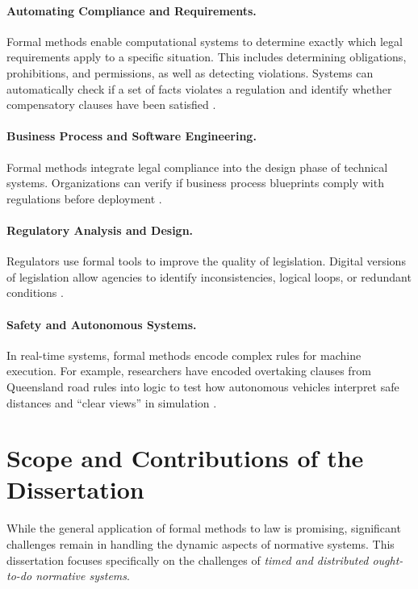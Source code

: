 \paragraph{Automating Compliance and Requirements.}

Formal methods enable computational systems to determine exactly which legal requirements apply to a specific situation. This includes determining obligations, prohibitions, and permissions, as well as detecting violations. Systems can automatically check if a set of facts violates a regulation and identify whether compensatory clauses have been satisfied \cite{governatori2018compliance}.

\paragraph{Business Process and Software Engineering.}

Formal methods integrate legal compliance into the design phase of technical systems. Organizations can verify if business process blueprints comply with regulations before deployment \cite{vanDerAalst2011compliance}.

\paragraph{Regulatory Analysis and Design.}

Regulators use formal tools to improve the quality of legislation. Digital versions of legislation allow agencies to identify inconsistencies, logical loops, or redundant conditions \cite{sergot1986british}.

\paragraph{Safety and Autonomous Systems.}

In real-time systems, formal methods encode complex rules for machine execution. For example, researchers have encoded overtaking clauses from Queensland road rules into logic to test how autonomous vehicles interpret safe distances and ``clear views'' in simulation \cite{DBLP:conf/jurix/BhuiyanGBDIR20}.

\section{Scope and Contributions of the Dissertation}

While the general application of formal methods to law is promising, significant challenges remain in handling the dynamic aspects of normative systems. This dissertation focuses specifically on the challenges of \emph{timed and distributed ought-to-do normative systems}.

